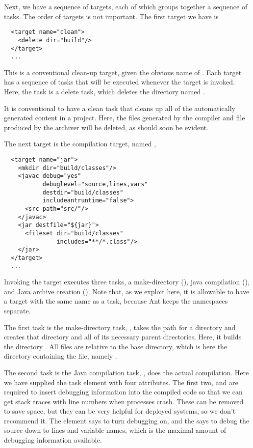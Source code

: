 Next, we have a sequence of targets, each of which groups together
a sequence of tasks.  The order of targets is not important.  The
first target we have is

\begin{verbatim}
  <target name="clean">
    <delete dir="build"/>
  </target>
  ...
\end{verbatim}
%
This is a conventional clean-up target, given the obvious name of
.  Each target has a sequence of tasks that will be
executed whenever the target is invoked.  Here, the task
is a delete task, which deletes the directory named .

It is conventional to have a clean task that cleans up all of
the automatically generated content in a project.  Here, the
 files generated by the compiler and 
file produced by the archiver will be deleted, as should soon be
evident.

The next target is the compilation target, named ,

\begin{verbatim}
  <target name="jar">
    <mkdir dir="build/classes"/>
    <javac debug="yes"
           debuglevel="source,lines,vars"
           destdir="build/classes"
           includeantruntime="false">
      <src path="src/"/>
    </javac>
    <jar destfile="${jar}">
      <fileset dir="build/classes"
               includes="**/*.class"/>
    </jar>
  </target>
  ...
\end{verbatim}
%
Invoking the  target executes three tasks, a make-directory
(), java compilation (), and Java archive
creation ().  Note that, as we exploit here, it is
allowable to have a target with the same name as a task, because Ant
keeps the namespaces separate.

The first task is the make-directory task, , takes the path for a directory and creates
that directory and all of its necessary parent directories.  Here,
it builds the directory .  All files are
relative to the base directory, which is here the directory containing
the  file, namely .

The second task is the Java compilation task, , does the
actual compilation.  Here we have supplied the task element with four
attributes.  The first two,  and  are
required to insert debugging information into the compiled code so
that we can get stack traces with line numbers when processes crash.
These can be removed to save space, but they can be very helpful for
deployed systems, so we don't recommend it.  The  element
says to turn debugging on, and the  says to debug the
source down to lines and variable names, which is the maximal amount
of debugging information available.

